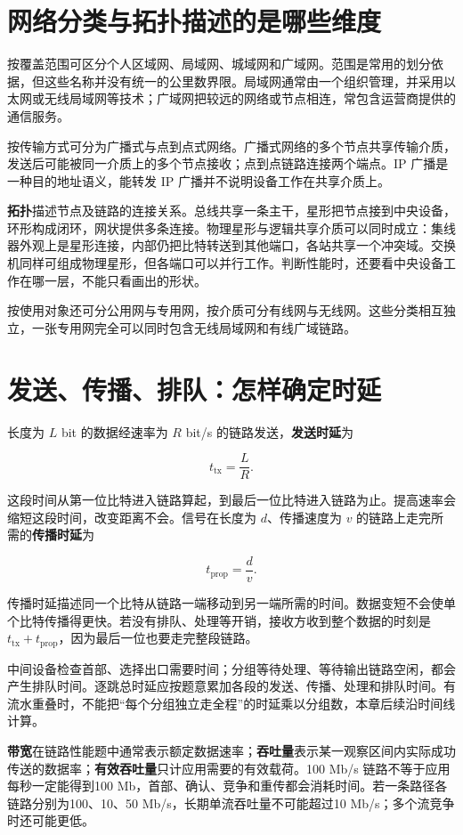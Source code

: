 \section{网络分类与拓扑描述的是哪些维度}\label{CN01-02}

按覆盖范围可区分个人区域网、局域网、城域网和广域网。范围是常用的划分依据，但这些名称并没有统一的公里数界限。局域网通常由一个组织管理，并采用以太网或无线局域网等技术；广域网把较远的网络或节点相连，常包含运营商提供的通信服务。

按传输方式可分为广播式与点到点式网络。广播式网络的多个节点共享传输介质，发送后可能被同一介质上的多个节点接收；点到点链路连接两个端点。IP 广播是一种目的地址语义，能转发 IP 广播并不说明设备工作在共享介质上。

\textbf{拓扑}描述节点及链路的连接关系。总线共享一条主干，星形把节点接到中央设备，环形构成闭环，网状提供多条连接。物理星形与逻辑共享介质可以同时成立：集线器外观上是星形连接，内部仍把比特转送到其他端口，各站共享一个冲突域。交换机同样可组成物理星形，但各端口可以并行工作。判断性能时，还要看中央设备工作在哪一层，不能只看画出的形状。

按使用对象还可分公用网与专用网，按介质可分有线网与无线网。这些分类相互独立，一张专用网完全可以同时包含无线局域网和有线广域链路。

\section{发送、传播、排队：怎样确定时延}\label{CN01-03}

长度为 \(L\) bit 的数据经速率为 \(R\) bit/s 的链路发送，\textbf{发送时延}为

\[t_{\mathrm{tx}}=\frac{L}{R}.\]

这段时间从第一位比特进入链路算起，到最后一位比特进入链路为止。提高速率会缩短这段时间，改变距离不会。信号在长度为 \(d\)、传播速度为 \(v\) 的链路上走完所需的\textbf{传播时延}为

\[t_{\mathrm{prop}}=\frac{d}{v}.\]

传播时延描述同一个比特从链路一端移动到另一端所需的时间。数据变短不会使单个比特传播得更快。若没有排队、处理等开销，接收方收到整个数据的时刻是 \(t_{\mathrm{tx}}+t_{\mathrm{prop}}\)，因为最后一位也要走完整段链路。

中间设备检查首部、选择出口需要时间；分组等待处理、等待输出链路空闲，都会产生排队时间。逐跳总时延应按题意累加各段的发送、传播、处理和排队时间。有流水重叠时，不能把``每个分组独立走全程''的时延乘以分组数，本章后续沿时间线计算。

\textbf{带宽}在链路性能题中通常表示额定数据速率；\textbf{吞吐量}表示某一观察区间内实际成功传送的数据率；\textbf{有效吞吐量}只计应用需要的有效载荷。100 Mb/s 链路不等于应用每秒一定能得到100 Mb，首部、确认、竞争和重传都会消耗时间。若一条路径各链路分别为100、10、50 Mb/s，长期单流吞吐量不可能超过10 Mb/s；多个流竞争时还可能更低。

